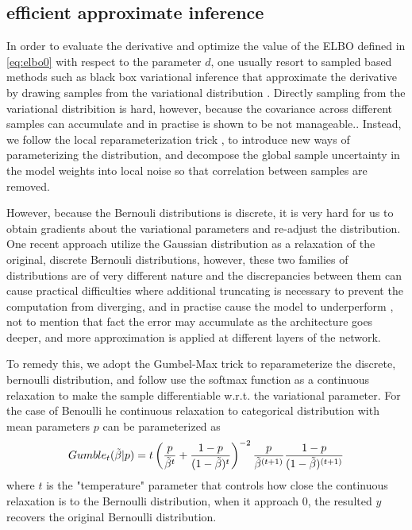 \subsection{efficient approximate inference}


In order to evaluate the derivative and optimize the value of the ELBO defined in \autoref{eq:elbo0} with respect to the parameter $d$, 
one usually resort to sampled based methods such as black box variational inference that approximate the derivative by drawing samples from the variational distribution \cite{ranganath2014black}. 
Directly sampling from the variational distribition is hard, however, because the covariance across different samples can accumulate and in practise is shown to be  not manageable.\cite{gal2017concrete}.
Instead, we follow the local reparameterization trick \citep{Kingma2015},
to introduce new ways of parameterizing the distribution, and 
decompose the global sample uncertainty in the model weights into local noise 
so that correlation between samples are removed.

However, because the Bernouli distributions is discrete, it is very hard for us to obtain gradients about the variational parameters and re-adjust the distribution. One recent approach  \cite{chen2019large} utilize the Gaussian distribution as a relaxation of the original, discrete 
Bernouli distributions, however, these two families of distributions are of very different nature and the discrepancies between them can cause practical difficulties where additional truncating is necessary to prevent the computation from diverging, and in practise cause the model to underperform
\cite{molchanov2016dropout}, 
not to mention that fact the error may accumulate as the architecture goes deeper, and more approximation is applied at different layers of the network.

To remedy this, we adopt the Gumbel-Max trick \cite{gumbel1954statistical, gummaddison2014sampling} to reparameterize the discrete, bernoulli distribution,
and follow \cite{jang2016categorical} use the softmax function as a continuous relaxation to make the sample differentiable w.r.t. the variational parameter. 
For the case of Benoulli he continuous relaxation to categorical distribution with mean parameters $p$ can be parameterized as 
\begin{equation}
Gumble_{t}( \tilde{\beta} | p) = t \left( \frac{p}{\tilde{\beta}^t} + \frac{1 - p}{(1- \tilde{\beta})^t} \right)^{-2} 
\frac{p}{\tilde{\beta}^{(t + 1)}} \frac{1 - p}{(1 - \tilde{\beta})^{(t + 1)}}  
\\
\end{equation}
where $t$ is the "temperature" parameter that controls how close the continuous relaxation is to the Bernoulli distribution, when it approach 0, the resulted $y$ recovers the original Bernoulli distribution.

